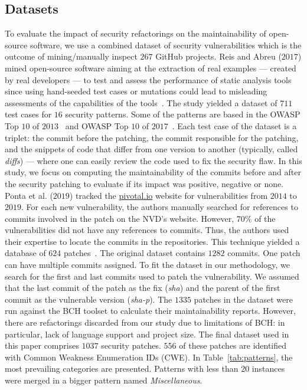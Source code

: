 \documentclass[sigconf,review]{acmart}
\begin{document}
\subsection{Datasets}
%
To evaluate the impact of security refactorings on the maintainability of
open-source software, we use a combined dataset of security vulnerabilities which is 
the outcome of mining/manually inspect $267$ GitHub projects. Reis and Abreu 
($2017$) mined open-source
software aiming at the extraction of real examples --- created by real
developers --- to test and assess the performance of static analysis tools~\cite{Reis:2017:IJSSE} since
using hand-seeded test cases or mutations could lead to misleading assessments
of the capabilities of the tools~\cite{just2014mutants}. The study yielded a
dataset of $711$ test cases for $16$ security patterns. Some of the patterns
are based in the OWASP Top $10$ of $2013$~\cite{oswap:2013} and OWASP Top $10$ of
$2017$~\cite{oswap:2017}. Each test case of the
dataset is a triplet: the commit before the patching, the commit responsible
for the patching, and the snippets of code that differ from one version to
another (typically, called \textit{diffs}) --- where one can easily review the
code used to fix the security flaw. In this study, we focus on computing the
maintainability of the commits before and after the security patching to
evaluate if its impact was positive, negative or none.
%
Ponta et al. ($2019$) tracked the \url{pivotal.io} website for vulnerabilities 
from $2014$ to $2019$. For each new vulnerability, the authors manually searched 
for references to commits involved in the patch on the NVD's website. However, $70\%$
of the vulnerabilities did not have any references to commits. Thus, the authors
used their expertise to locate the commits in the repositories. This technique 
yielded a database of $624$ patches~\cite{10.1109/MSR.2019.00064}. The original 
dataset contains $1282$ commits. One patch can have multiple commits assigned.
To fit the dataset in our methodology, we search for the first and last commits
used to patch the vulnerability. We assumed that the last commit of the patch as 
the fix (\emph{sha}) and the parent of the first commit as the vulnerable version 
(\emph{sha-p}).
%
The $1335$ patches in the dataset were run against the BCH toolset to
calculate their maintainability reports. However, there are refactorings
discarded from our study due to limitations of BCH: in particular, lack of
language support and project size. The final dataset used in this paper comprises
$1037$ security patches. $556$ of these patches are identified with Common Weakness
Enumeration IDs (CWE). In Table~\ref{tab:patterns}, the most prevailing categories are presented. Patterns
with less than $20$ instances were merged in a bigger pattern named \textit{Miscellaneous}.
\end{document}
